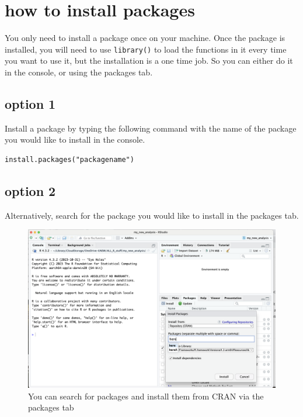 \documentclass[
  letterpaper,
  DIV=11,
  numbers=noendperiod]{scrreprt}
\begin{document}

\chapter{how to install packages}\label{how-to-install-packages}

You only need to install a package once on your machine. Once the
package is installed, you will need to use \texttt{library()} to load
the functions in it every time you want to use it, but the installation
is a one time job. So you can either do it in the console, or using the
packages tab.

\section{option 1}\label{option-1}

Install a package by typing the following command with the name of the
package you would like to install in the console.

\begin{verbatim}
install.packages("packagename")
\end{verbatim}

\section{option 2}\label{option-2}

Alternatively, search for the package you would like to install in the
packages tab.

\begin{figure}[H]

{\centering \includegraphics{images/install.png}

}

\caption{You can search for packages and install them from CRAN via the
packages tab}

\end{figure}%
\end{document}
